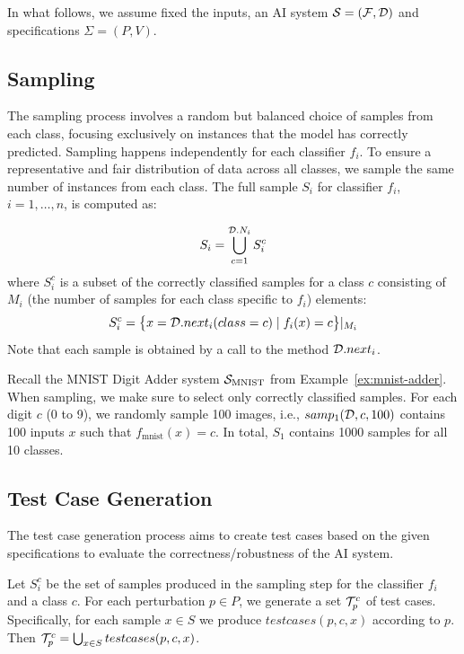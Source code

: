 \documentclass[10pt, conference, a4paper, final]{IEEEtran}
\begin{document}
\smallskip

In what follows, we assume fixed the inputs, an AI system $\S=(\F,\D)$
and specifications $\Sigma=(P,V)$.

\subsection{Sampling}
The sampling process involves a random but balanced choice of samples from each class, focusing exclusively on instances that the model has correctly predicted.
%
Sampling happens independently for each classifier $f_i$. To ensure a representative and fair distribution of data across all classes, we sample the same number of instances from each class. The full sample $S_i$ for classifier $f_i$, $i=1,\dots,n$, is computed as:

\begin{equation}
S_i = \bigcup_{c=1}^{\D.N_i} S_i^c
\end{equation}
%
where $S_i^c$ is a subset of the correctly classified samples for a class $c$ consisting of $M_i$ (the number of samples for each class specific to $f_i$) elements:
\[S_i^c = \big\{x = \D.next_i(class=c)\mid f_i(x)=c\big\}|_{M_i}\] Note that each sample is obtained by a call to the method $\D.next_i$.

\begin{example} Recall the MNIST Digit Adder system $\S_{\text{MNIST}}$ from Example~\ref{ex:mnist-adder}.
  When sampling, we make sure to select only correctly classified
  samples. For each digit $c$ (0 to 9), we randomly sample 100 images,
  i.e., $samp_1(\D,c,100)$ contains 100 inputs $x$ such that
  $f_{\text{mnist}}(x) = c$. In total, $S_1$ contains 1000 samples for
  all 10 classes.
\end{example}

  \subsection{Test Case Generation}
  The test case generation process aims to create test cases based on the given specifications to evaluate the correctness/robustness of the AI system.

  Let $S_i^c$ be the set of samples produced in the sampling step for the classifier $f_i$ and a class $c$. For each perturbation $p\in P$, we generate a set $\T_p^c$ of test cases. Specifically, for each sample $x\in S$ we produce $testcases(p,c,x)$ according to $p$. Then $\T_p^c = \bigcup_{x\in S} testcases(p,c,x)$.
  
\end{document}
